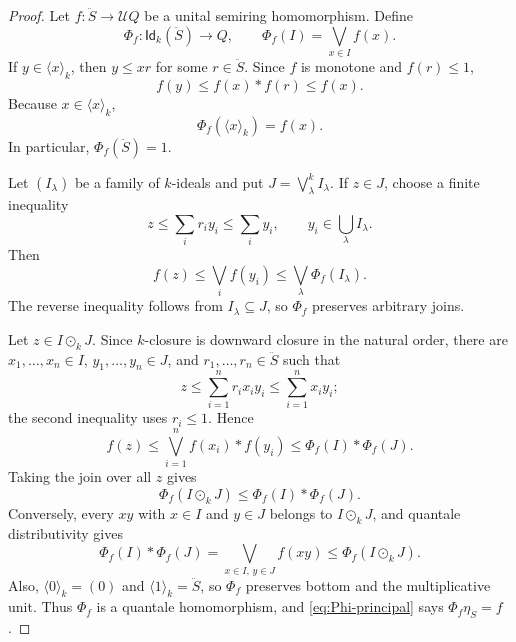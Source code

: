 \documentclass[12pt,leqno]{amsart}
\newcommand{\Idk}{\mathsf{Id}_{k}}
\theoremstyle{definition}
\numberwithin{equation}{section}
\theoremstyle{remark}
\def\leq{\leqslant}
\begin{document}
\begin{proof}
Let \(f\colon\ddot S\to\mathcal UQ\) be a unital semiring homomorphism. Define
\[
\Phi_f\colon\Idk(\ddot S)\longrightarrow Q,
\qquad
\Phi_f(I)=\bigvee_{x\in I}f(x).
\]
If \(y\in\langle x\rangle_k\), then \(y\leq xr\) for some \(r\in\ddot S\). Since $f$ is monotone and \(f(r)\leq1\),
\[
f(y)\leq f(x)*f(r)\leq f(x).
\]
Because \(x\in\langle x\rangle_k\),
\begin{equation}\label{eq:Phi-principal}
\Phi_f(\langle x\rangle_k)=f(x).
\end{equation}
In particular, \(\Phi_f(\ddot S)=1\).

Let \((I_\lambda)\) be a family of $k$-ideals and put
\(J=\bigvee^k_\lambda I_\lambda\). If \(z\in J\), choose a finite inequality
\[
z\leq\sum_i r_i y_i\leq\sum_i y_i,
\qquad
y_i\in\bigcup_\lambda I_\lambda.
\]
Then
\[
f(z)\leq\bigvee_i f(y_i)
 \leq\bigvee_\lambda\Phi_f(I_\lambda).
\]
The reverse inequality follows from \(I_\lambda\subseteq J\), so \(\Phi_f\) preserves arbitrary joins.

Let \(z\in I\odot_kJ\). Since $k$-closure is downward closure in the natural order, there are \(x_1,\ldots,x_n\in I\), \(y_1,\ldots,y_n\in J\), and \(r_1,\ldots,r_n\in\ddot S\) such that
\[
z\leq\sum_{i=1}^n r_i x_i y_i
 \leq\sum_{i=1}^n x_i y_i;
\]
the second inequality uses \(r_i\leq1\). Hence
\[
f(z)\leq\bigvee_{i=1}^n f(x_i)*f(y_i)
 \leq\Phi_f(I)*\Phi_f(J).
\]
Taking the join over all $z$ gives
\[
\Phi_f(I\odot_kJ)\leq\Phi_f(I)*\Phi_f(J).
\]
Conversely, every \(xy\) with \(x\in I\) and \(y\in J\) belongs to \(I\odot_kJ\), and quantale distributivity gives
\[
\Phi_f(I)*\Phi_f(J)
 =\bigvee_{x\in I,\,y\in J}f(xy)
 \leq\Phi_f(I\odot_kJ).
\]
Also, \(\langle0\rangle_k=(0)\) and \(\langle1\rangle_k=\ddot S\), so \(\Phi_f\) preserves bottom and the multiplicative unit. Thus \(\Phi_f\) is a quantale homomorphism, and \eqref{eq:Phi-principal} says
\(\Phi_f\eta_{\ddot S}=f\).


\end{proof}
\end{document}

